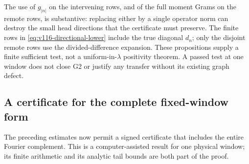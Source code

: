 \documentclass[11pt]{article}
\theoremstyle{remark}
\begin{document}
The use of $g_{|n|}$ on the intervening rows, and of the full moment
Grams on the remote rows, is substantive: replacing either by a
single operator norm can destroy the small head directions that the
certificate must preserve.  The finite rows in
\eqref{eq:v116-directional-lower} include the true diagonal $d_n$;
only the disjoint remote rows use the divided-difference expansion.
These propositions supply a finite sufficient test, not a
uniform-in-$\lambda$ positivity theorem.  A passed test at one window
does not close G2 or justify any transfer without its existing graph
defect.

\subsection*{A certificate for the complete fixed-window form}
The preceding estimates now permit a signed certificate that includes
the entire Fourier complement. This is a computer-assisted result for
one physical window; its finite arithmetic and its analytic tail bounds
are both part of the proof.
\end{document}

